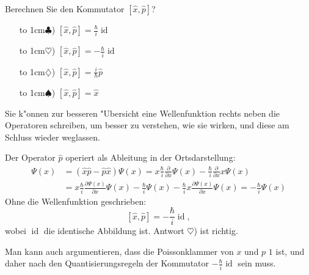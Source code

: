 Berechnen Sie den Kommutator $[\hat x,\hat p]$?
\begin{itemize}
\item[\hbox to 1cm{$\clubsuit$)\hfill}]
$[\hat x,\hat p]=\frac{\hbar}{i}\operatorname{id}$
\item[\hbox to 1cm{$\heartsuit$)\hfill}]
$[\hat x,\hat p]=-\frac{\hbar}{i}\operatorname{id}$
\item[\hbox to 1cm{$\diamondsuit$)\hfill}]
$[\hat x,\hat p]=\frac{i}{\hbar}\hat p$
\item[\hbox to 1cm{$\spadesuit$)\hfill}]
$[\hat x,\hat p]=\hat x$
\end{itemize}

\begin{hinweis}
Sie k"onnen zur besseren "Ubersicht eine Wellenfunktion rechts neben
die Operatoren schreiben, um besser zu verstehen, wie sie wirken, und
diese am Schluss wieder weglassen.
\end{hinweis}

\begin{loesung}
Der Operator $\hat p$ operiert als Ableitung in der Ortsdarstellung:
\begin{align*}
[\hat x,\hat p]\Psi(x)
&=
(\hat x\hat p-\hat p\hat x)\Psi(x)
=
x\frac{\hbar}{i}\frac{\partial}{\partial x}\Psi(x)
-
\frac{\hbar}{i}\frac{\partial}{\partial x}x\Psi(x)
\\
&=
x\frac{\hbar}{i}\frac{\partial\Psi(x)}{\partial x}\Psi(x)
-
\frac{\hbar}{i}\Psi(x)
-
\frac{\hbar}{i}x\frac{\partial \Psi(x)}{\partial x}\Psi(x)
=
-\frac{\hbar}{i}\Psi(x)
\end{align*}
Ohne die Wellenfunktion geschrieben:
\[
[\hat x,\hat p]=-\frac{\hbar}{i}\operatorname{id},
\]
wobei $\operatorname{id}$ die identische Abbildung ist.
Antwort $\heartsuit$) ist richtig.

Man kann auch argumentieren, dass die Poissonklammer von $x$ und $p$ $1$ ist,
und daher nach den Quantisierungsregeln der Kommutator 
$-\frac{\hbar}{i}\operatorname{id}$ sein muss.
\end{loesung}



